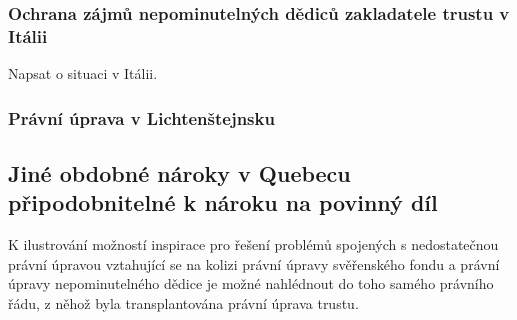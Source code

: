 \documentclass{article}
\begin{document}


\subsubsection{Ochrana zájmů nepominutelných dědiců zakladatele trustu v Itálii}

Napsat o situaci v Itálii.

\subsubsection{Právní úprava v Lichtenštejnsku}


\subsection{Jiné obdobné nároky v Quebecu připodobnitelné k nároku na povinný díl}

K ilustrování možností inspirace pro řešení problémů spojených s nedostatečnou právní úpravou vztahující se na kolizi právní úpravy svěřenského fondu a právní úpravy nepominutelného dědice je možné nahlédnout do toho samého právního řádu, z něhož byla transplantována právní úprava trustu.



\end{document}
